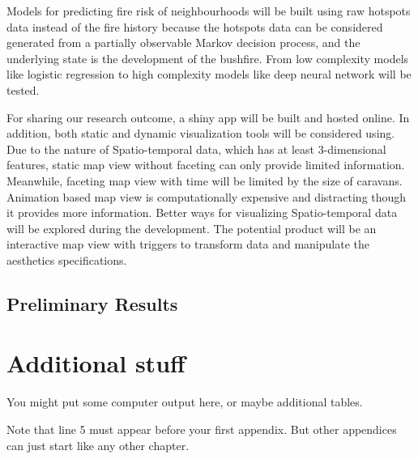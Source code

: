 \documentclass{monashthesis}
\begin{document}
Models for predicting fire risk of neighbourhoods will be built using
raw hotspots data instead of the fire history because the hotspots data
can be considered generated from a partially observable Markov decision
process, and the underlying state is the development of the bushfire.
From low complexity models like logistic regression to high complexity
models like deep neural network will be tested.

For sharing our research outcome, a shiny app will be built and hosted
online. In addition, both static and dynamic visualization tools will be
considered using. Due to the nature of Spatio-temporal data, which has
at least 3-dimensional features, static map view without faceting can
only provide limited information. Meanwhile, faceting map view with time
will be limited by the size of caravans. Animation based map view is
computationally expensive and distracting though it provides more
information. Better ways for visualizing Spatio-temporal data will be
explored during the development. The potential product will be an
interactive map view with triggers to transform data and manipulate the
aesthetics specifications.

\section{Preliminary Results}\label{preliminary-results}

\appendix

\chapter{Additional stuff}\label{additional-stuff}

You might put some computer output here, or maybe additional tables.

Note that line 5 must appear before your first appendix. But other
appendices can just start like any other chapter.

\printbibliography[heading=bibintoc]
\end{document}
